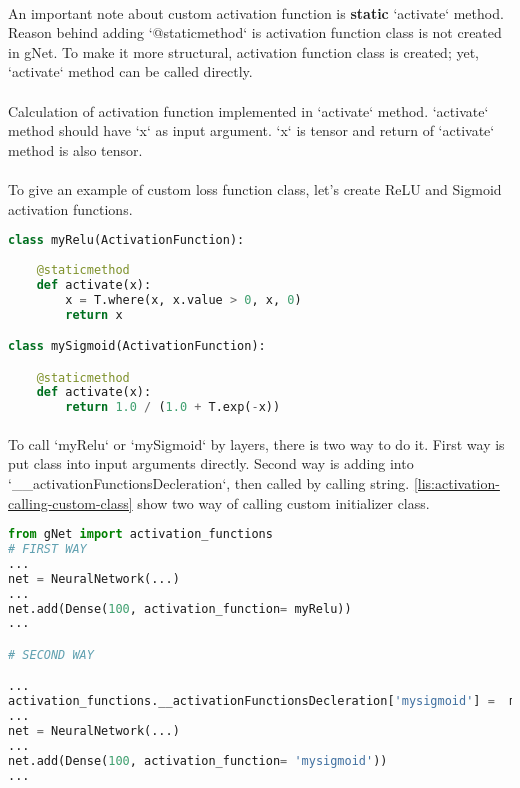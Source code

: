 \documentclass[12pt]{report}
\begin{document}
\paragraph{}
An important note about custom activation function is \textbf{static} `activate` method. Reason behind adding `@staticmethod` is activation function class is not created in gNet. To make it more structural, activation function class is created; yet, `activate` method can be called directly. 

\paragraph{}
Calculation of activation function implemented in `activate` method. `activate` method should have `x` as input argument. `x` is tensor and return of `activate` method is also tensor. 

\paragraph{}
To give an example of custom loss function class, let's create ReLU and Sigmoid activation functions.


\begin{lstlisting}[language=Python, numbers=none, caption={Custom activation function classes.}, label={lis:activation-function-custom-class}]
class myRelu(ActivationFunction):
  
	@staticmethod
	def activate(x):  
		x = T.where(x, x.value > 0, x, 0)
		return x

class mySigmoid(ActivationFunction):

	@staticmethod
	def activate(x):
		return 1.0 / (1.0 + T.exp(-x))

\end{lstlisting}

\paragraph{}
To call `myRelu` or `mySigmoid` by layers, there is two way to do it. First way is put class into input arguments directly. Second way is adding into  `\_\_activationFunctionsDecleration`, then called by calling string. \ref{lis:activation-calling-custom-class} show two way of calling custom initializer class.

\begin{lstlisting}[language=Python, numbers=none,  caption={Calling custom activation function class.}, label={lis:activation-calling-custom-class}]
from gNet import activation_functions
# FIRST WAY
...
net = NeuralNetwork(...)
...
net.add(Dense(100, activation_function= myRelu))
...

# SECOND WAY

...
activation_functions.__activationFunctionsDecleration['mysigmoid'] =  mySigmoid
...
net = NeuralNetwork(...)
...
net.add(Dense(100, activation_function= 'mysigmoid'))
...

\end{lstlisting}
\end{document}
